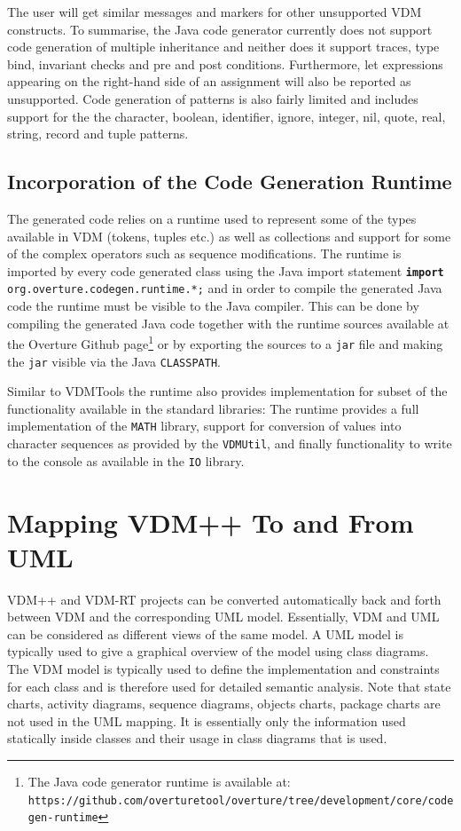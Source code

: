\documentclass{overturerepchap}
\newcommand{\url}[1]{\texttt{#1}}
\begin{document}
The user will get similar messages and markers for other unsupported VDM constructs. To summarise, the Java code generator currently does not support code generation of multiple inheritance and neither does it support traces, type bind, invariant checks and pre and post conditions. Furthermore, let expressions appearing on the right-hand side of an assignment will also be reported as unsupported. Code generation of patterns is also fairly limited and includes support for the the character, boolean, identifier, ignore, integer, nil, quote, real, string, record and tuple patterns.

\section{Incorporation of the Code Generation Runtime}

The generated code relies on a runtime used to represent some of the types available in VDM (tokens, tuples etc.) as well as collections and support for some of the complex operators such as sequence modifications. The runtime is imported by every code generated class using the Java import statement \texttt{\textbf{import} org.overture.codegen.runtime.*;} and in order to compile the generated Java code the runtime must be visible to the Java compiler. This can be done by compiling the generated Java code together with the runtime sources available at the Overture Github page\footnote{The Java code generator runtime is available at: \url{https://github.com/overturetool/overture/tree/development/core/codegen-runtime}} or by exporting the sources to a \texttt{jar} file and making the \texttt{jar} visible via the Java \texttt{CLASSPATH}.

Similar to VDMTools the runtime also provides implementation for subset of the functionality available in the standard libraries: The runtime provides a full implementation of the \texttt{MATH} library, support for conversion of values into character sequences as provided by the \texttt{VDMUtil}, and finally functionality to write to the console as available in the \texttt{IO} library.

\chapter{Mapping VDM++ To and From UML}\label{sec:vdmuml}

VDM++ and VDM-RT projects can be converted automatically back and forth between
VDM and the corresponding UML model.  Essentially, VDM and UML can be
considered as different views of the same model. A UML model is typically used
to give a graphical overview of the model using class diagrams.  The VDM model
is typically used to define the implementation and constraints for each class
and is therefore used for detailed semantic analysis. Note that state charts,
activity diagrams, sequence diagrams, objects charts, package charts are not
used in the UML mapping. It is essentially only the information
used statically inside classes and their usage in class diagrams that is used.
\end{document}

